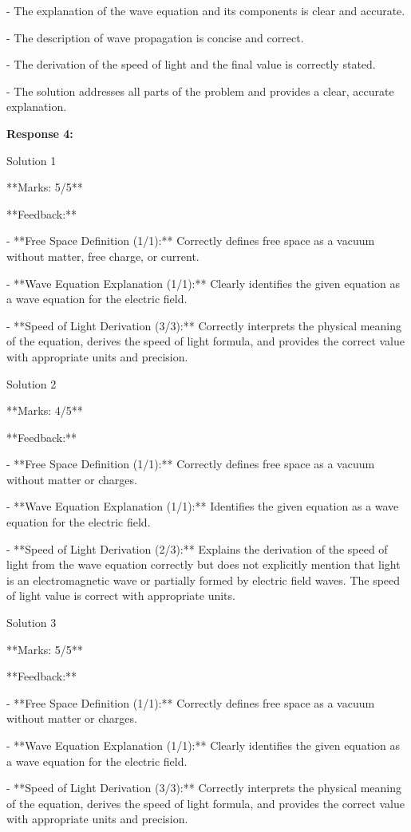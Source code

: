 \documentclass[a4paper,11pt]{article}
\begin{document}
- The explanation of the wave equation and its components is clear and accurate.

- The description of wave propagation is concise and correct.

- The derivation of the speed of light and the final value is correctly stated.

- The solution addresses all parts of the problem and provides a clear, accurate explanation.

\bigskip    
\textbf{Response 4:}

Solution 1

**Marks: 5/5**

**Feedback:**

- **Free Space Definition (1/1):** Correctly defines free space as a vacuum without matter, free charge, or current.

- **Wave Equation Explanation (1/1):** Clearly identifies the given equation as a wave equation for the electric field.

- **Speed of Light Derivation (3/3):** Correctly interprets the physical meaning of the equation, derives the speed of light formula, and provides the correct value with appropriate units and precision.

Solution 2

**Marks: 4/5**

**Feedback:**

- **Free Space Definition (1/1):** Correctly defines free space as a vacuum without matter or charges.

- **Wave Equation Explanation (1/1):** Identifies the given equation as a wave equation for the electric field.

- **Speed of Light Derivation (2/3):** Explains the derivation of the speed of light from the wave equation correctly but does not explicitly mention that light is an electromagnetic wave or partially formed by electric field waves. The speed of light value is correct with appropriate units.

Solution 3

**Marks: 5/5**

**Feedback:**

- **Free Space Definition (1/1):** Correctly defines free space as a vacuum without matter or charges.

- **Wave Equation Explanation (1/1):** Clearly identifies the given equation as a wave equation for the electric field.

- **Speed of Light Derivation (3/3):** Correctly interprets the physical meaning of the equation, derives the speed of light formula, and provides the correct value with appropriate units and precision.
\end{document}
